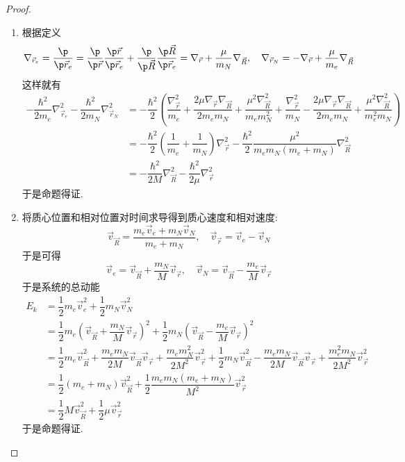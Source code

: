 \documentclass{ctexart}
\begin{document}
\begin{proof}
\begin{enumerate}[label=\tbf{(\alph*)}]
    \item 根据定义
    \[\nabla_{\vec{r}_e}=\dfrac{\p}{\p\vec{r}_e}=\dfrac{\p}{\p\vec{r}}\dfrac{\p\vec{r}}{\p\vec{r}_e}+\dfrac{\p}{\p\vec{R}}\dfrac{\p\vec{R}}{\p\vec{r}_e}=\nabla_{\vec{r}}+\dfrac{\mu}{m_N}\nabla_{\vec{R}},\quad\nabla_{\vec{r}_N}=-\nabla_{\vec{r}}+\dfrac{\mu}{m_e}\nabla_{\vec{R}}\]
    这样就有
    \[\begin{aligned}
        -\dfrac{\hbar^2}{2m_e}\nabla_{\vec{r}_e}^2-\dfrac{\hbar^2}{2m_N}\nabla_{\vec{r}_N}^2
        &=-\dfrac{\hbar^2}{2}\left(\dfrac{\nabla_{\vec{r}}^2}{m_e}+\dfrac{2\mu\nabla_{\vec{r}}\nabla_{\vec{R}}}{2m_em_N}+\dfrac{\mu^2\nabla_{\vec{R}}^2}{m_em_N^2}+\dfrac{\nabla_{\vec{r}}^2}{m_N}-\dfrac{2\mu\nabla_{\vec{r}}\nabla_{\vec{R}}}{2m_em_N}+\dfrac{\mu^2\nabla_{\vec{R}}^2}{m_e^2m_N}\right)\\
        &=-\dfrac{\hbar^2}{2}\left(\dfrac{1}{m_e}+\dfrac{1}{m_N}\right)\nabla_{\vec{r}}^2-\dfrac{\hbar^2}{2}\dfrac{\mu^2}{m_em_N\left(m_e+m_N\right)}\nabla_{\vec{R}}^2\\
        &=-\dfrac{\hbar^2}{2M}\nabla_{\vec{R}}^2-\dfrac{\hbar^2}{2\mu}\nabla_{\vec{r}}^2
    \end{aligned}\]
    于是命题得证.
    \item 将质心位置和相对位置对时间求导得到质心速度和相对速度:
    \[\vec{v}_{\vec{R}}=\dfrac{m_e\vec{v}_e+m_N\vec{v}_N}{m_e+m_N},\quad\vec{v}_{\vec{r}}=\vec{v}_e-\vec{v}_N\]
    于是可得
    \[\vec{v}_e=\vec{v}_{\vec{R}}+\dfrac{m_N}{M}\vec{v}_{\vec{r}},\quad\vec{v}_N=\vec{v}_{\vec{R}}-\dfrac{m_e}{M}\vec{v}_{\vec{r}}\]
    于是系统的总动能
    \[\begin{aligned}
        E_k
        &=\dfrac12m_e\vec{v}_e^2+\dfrac12m_N\vec{v}_N^2\\
        &=\dfrac12m_e\left(\vec{v}_{\vec{R}}+\dfrac{m_N}{M}\vec{v}_{\vec{r}}\right)^2+\dfrac12m_N\left(\vec{v}_{\vec{R}}-\dfrac{m_e}{M}\vec{v}_{\vec{r}}\right)^2\\
        &=\dfrac12m_e\vec{v}_{\vec{R}}^2+\dfrac{m_em_N}{2M}\vec{v}_{\vec{R}}\vec{v}_{\vec{r}}+\dfrac{m_em_N^2}{2M^2}\vec{v}_{\vec{r}}^2+\dfrac12m_N\vec{v}_{\vec{R}}^2-\dfrac{m_em_N}{2M}\vec{v}_{\vec{R}}\vec{v}_{\vec{r}}+\dfrac{m_e^2m_N}{2M^2}\vec{v}_{\vec{r}}^2\\
        &=\dfrac12\left(m_e+m_N\right)\vec{v}_{\vec{R}}^2+\dfrac12\dfrac{m_em_N\left(m_e+m_N\right)}{M^2}\vec{v}_{\vec{r}}^2\\
        &=\dfrac12M\vec{v}_{\vec{R}}^2+\dfrac12\mu\vec{v}_{\vec{r}}^2
    \end{aligned}\]
    于是命题得证.
\end{enumerate}
\end{proof}
\end{document}
